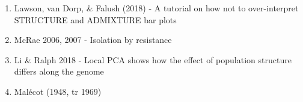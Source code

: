 \documentclass[12pt]{article}
\begin{document}
\begin{enumerate}
\item Lawson, van Dorp, \& Falush (2018) - A tutorial on how not to over-interpret STRUCTURE and ADMIXTURE bar plots
\subitem 

\item McRae 2006, 2007 - Isolation by resistance
\subitem 

\item Li \& Ralph 2018 - Local PCA shows how the effect of population structure differs along the genome
\subitem 

\item Mal\'{e}cot (1948, tr 1969)
\subitem

\end{enumerate}
\end{document}
